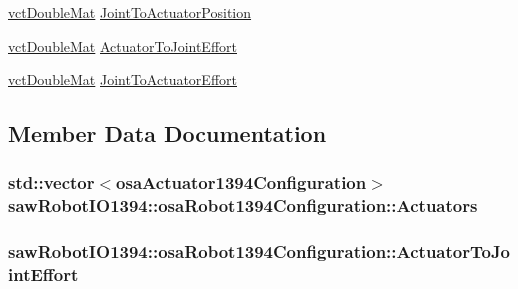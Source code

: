 \begin{DoxyCompactItemize}
\hyperlink{vct_dynamic_matrix_types_8h_a48f1eb2461d20a99e824ee5753a37c84}{vct\+Double\+Mat} \hyperlink{structsaw_robot_i_o1394_1_1osa_robot1394_configuration_a1a9f1e51d951ab2f5e56fd3dac31e698}{Joint\+To\+Actuator\+Position}
\item 
\hyperlink{vct_dynamic_matrix_types_8h_a48f1eb2461d20a99e824ee5753a37c84}{vct\+Double\+Mat} \hyperlink{structsaw_robot_i_o1394_1_1osa_robot1394_configuration_afc66600beb470e3956bbf84b68e51a77}{Actuator\+To\+Joint\+Effort}
\item 
\hyperlink{vct_dynamic_matrix_types_8h_a48f1eb2461d20a99e824ee5753a37c84}{vct\+Double\+Mat} \hyperlink{structsaw_robot_i_o1394_1_1osa_robot1394_configuration_ad8c36be42ce9cc0f091b44eb81011eb3}{Joint\+To\+Actuator\+Effort}
\end{DoxyCompactItemize}


\subsection{Member Data Documentation}
\hypertarget{structsaw_robot_i_o1394_1_1osa_robot1394_configuration_a1f32b7a5a19e4774370b591cb92d1650}{}
\subsubsection[{Actuators}]{\setlength{\rightskip}{0pt plus 5cm}std\+::vector$<${\bf osa\+Actuator1394\+Configuration}$>$ saw\+Robot\+I\+O1394\+::osa\+Robot1394\+Configuration\+::\+Actuators}\label{structsaw_robot_i_o1394_1_1osa_robot1394_configuration_a1f32b7a5a19e4774370b591cb92d1650}
\hypertarget{structsaw_robot_i_o1394_1_1osa_robot1394_configuration_afc66600beb470e3956bbf84b68e51a77}{}
\subsubsection[{Actuator\+To\+Joint\+Effort}]{ saw\+Robot\+I\+O1394\+::osa\+Robot1394\+Configuration\+::\+Actuator\+To\+Joint\+Effort}\label{structsaw_robot_i_o1394_1_1osa_robot1394_configuration_afc66600beb470e3956bbf84b68e51a77}
\hypertarget{structsaw_robot_i_o1394_1_1osa_robot1394_configuration_ab0eb79678ff7a831df47a83585ee85b3}{}
